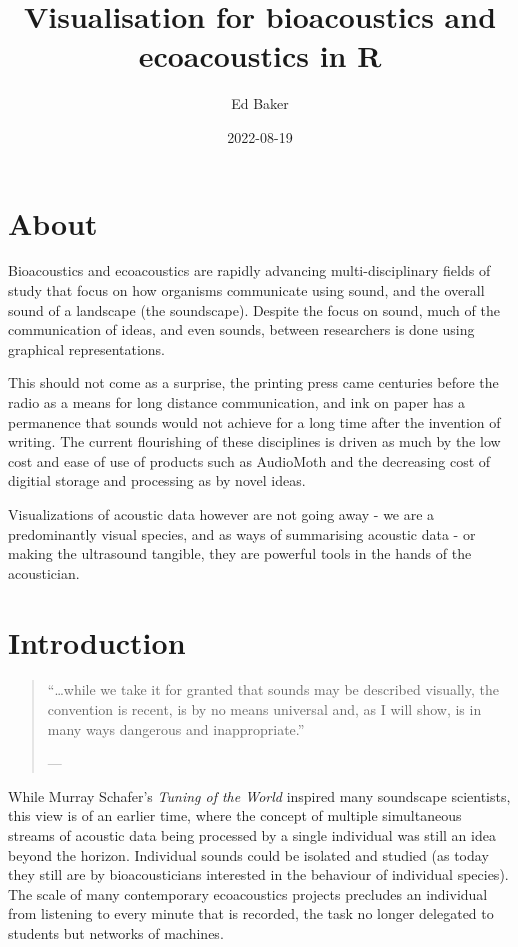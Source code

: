 \documentclass[
]{book}
\title{Visualisation for bioacoustics and ecoacoustics in R}
\author{Ed Baker}
\date{2022-08-19}
\begin{document}
\maketitle

{
\setcounter{tocdepth}{1}
\tableofcontents
}
\hypertarget{about}{%
\chapter*{About}\label{about}}

Bioacoustics and ecoacoustics are rapidly advancing multi-disciplinary fields of study that focus on how organisms communicate using sound, and the overall sound of a landscape (the soundscape). Despite the focus on sound, much of the communication of ideas, and even sounds, between researchers is done using graphical representations.

This should not come as a surprise, the printing press came centuries before the radio as a means for long distance communication, and ink on paper has a permanence that sounds would not achieve for a long time after the invention of writing. The current flourishing of these disciplines is driven as much by the low cost and ease of use of products such as AudioMoth and the decreasing cost of digitial storage and processing as by novel ideas.

Visualizations of acoustic data however are not going away - we are a predominantly visual species, and as ways of summarising acoustic data - or making the ultrasound tangible, they are powerful tools in the hands of the acoustician.

\hypertarget{intro}{%
\chapter{Introduction}\label{intro}}

\begin{quote}
``\ldots while we take it for granted that sounds may be described visually, the convention is recent, is by no means universal and, as I will show, is in many ways dangerous and inappropriate.''

\hfill --- \citet{schafer1977}
\end{quote}

While Murray Schafer's \emph{Tuning of the World} \citep{schafer1977} inspired many soundscape scientists, this view is of an earlier time, where the concept of multiple simultaneous streams of acoustic data being processed by a single individual was still an idea beyond the horizon. Individual sounds could be isolated and studied (as today they still are by bioacousticians interested in the behaviour of individual species). The scale of many contemporary ecoacoustics projects precludes an individual from listening to every minute that is recorded, the task no longer delegated to students but networks of machines.
\end{document}
